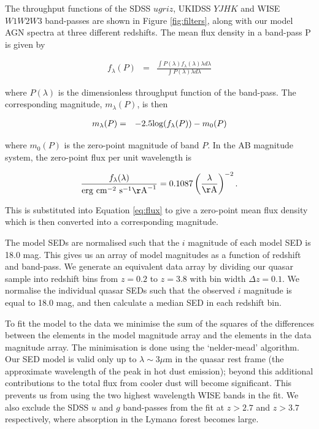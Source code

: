 The throughput functions of the SDSS $ugriz$, UKIDSS $YJHK$ and WISE $W1W2W3$ band-passes are shown in Figure \ref{fig:filters}, along with our model AGN spectra at three different redshifts. 
The mean flux density in a band-pass P is given by 

\begin{eqnarray}
  \label{eq:flux}
  f_{\lambda}(P) & = & \frac{\int P(\lambda) f_\lambda(\lambda) \lambda d\lambda }{\int P(\lambda) \lambda d\lambda}
\end{eqnarray}

where $P(\lambda)$ is the dimensionless throughput function of the band-pass. 
The corresponding magnitude, $m_\lambda(P)$, is then 

\begin{eqnarray}
  m_\lambda(P) & = & -2.5{\rm log}(f_\lambda(P)) - m_0(P)
\end{eqnarray}

where $m_0(P)$ is the zero-point magnitude of band $P$. In the AB magnitude system, the zero-point flux per unit wavelength is 

\begin{eqnarray}
  \frac{f_\lambda(\lambda)}{{\rm erg}~{\rm cm}^{-2}~{\rm s}^{-1} {\rm\AA}^{-1}} = 0.1087 \left(\frac{\lambda}{\rm \AA}\right)^{-2} .
\end{eqnarray}

This is substituted into Equation \ref{eq:flux} to give a zero-point mean flux density which is then converted into a corresponding magnitude.  

The model SEDs are normalised such that the $i$ magnitude of each model SED is 18.0 mag. 
This gives us an array of model magnitudes as a function of redshift and band-pass. 
We generate an equivalent data array by dividing our quasar sample into redshift bins from $z=0.2$ to $z=3.8$ with bin width $\Delta z = 0.1$. 
We normalise the individual quasar SEDs such that the observed $i$ magnitude is equal to 18.0 mag, and then calculate a median SED in each redshift bin. 

To fit the model to the data we minimise the sum of the squares of the differences between the elements in the model magnitude array and the elements in the data magnitude array. 
The minimisation is done using the `nelder-mead' algorithm. 
Our SED model is valid only up to $\lambda \sim 3\mu$m in the quasar rest frame (the approximate wavelength of the peak in hot dust emission); beyond this additional contributions to the total flux from cooler dust will become significant. 
This prevents us from using the two highest wavelength WISE bands in the fit. 
We also exclude the SDSS $u$ and $g$ band-passes from the fit at $z > 2.7$ and $z > 3.7$ respectively, where absorption in the Lyman$\alpha$ forest becomes large. 

